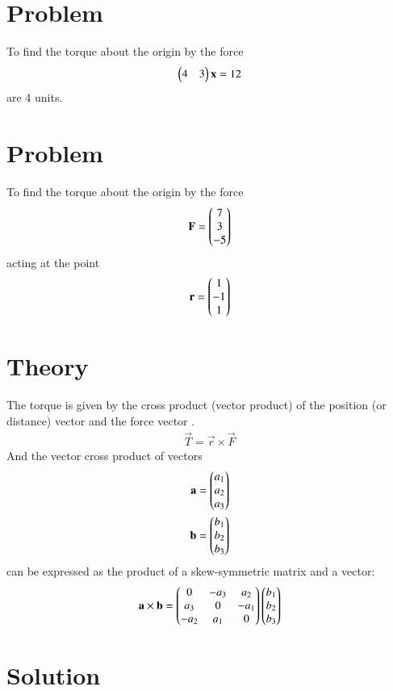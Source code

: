 \documentclass[journal,12pt,twocolumn]{IEEEtran}
\begin{document}
\section{Problem}
To find the torque about the origin by the force 
\begin{align}
\begin{pmatrix}4 & 3\end{pmatrix} \mathbf{x} = 12
\end{align}
are 4 units.

\section{Problem}
To find the torque about the origin by the force
\begin{align}
\mathbf{F} = \begin{pmatrix}  7 \\  3 \\ -5\end{pmatrix}
\end{align}
acting at the point 
\begin{align}
\mathbf{r} = \begin{pmatrix}  1 \\  -1 \\ 1\end{pmatrix}
\end{align}

\section{Theory}
The torque  is given by the cross product (vector product) of the position (or distance) vector   and the force vector .
\begin{align}
    \vec{T} = {\vec{r}  \times  \vec{F}}
\end{align}
And the vector cross product of vectors 
\begin{align}
\mathbf{a} = \begin{pmatrix}  a_1 \\  a_2 \\ a_3\end{pmatrix}
\\
\mathbf{b} = \begin{pmatrix}  b_1 \\  b_2  \\ b_3\end{pmatrix}
\end{align}
can be expressed as the product of a skew-symmetric matrix and a vector:
\begin{align}
\mathbf{a \times b} = \begin{pmatrix}0 & -a_3 & a_2\\ a_3& 0 &-a_1 \\ -a_2 & a_1 & 0 \end{pmatrix} \begin{pmatrix}b_1\\b_2\\b_3\end{pmatrix}    
\end{align}
\section{Solution}
\end{document}
